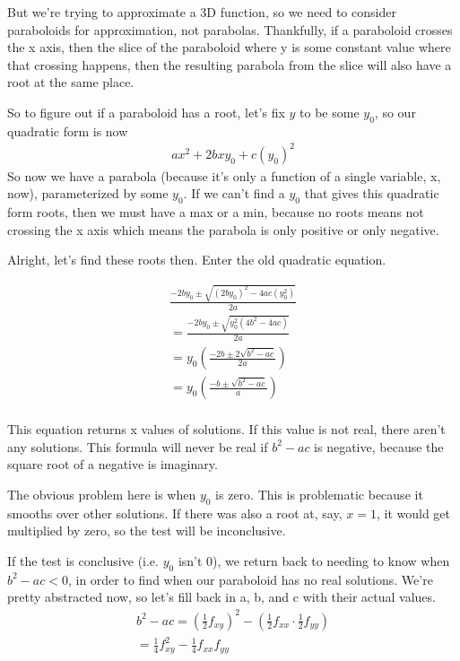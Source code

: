 \documentclass[12pt, letterpaper]{article}
\begin{document}
But we're trying to approximate a 3D function, so we need to consider paraboloids for approximation, not parabolas. Thankfully, if a paraboloid crosses the x axis, then the slice of the paraboloid where y is some constant value where that crossing happens, then the resulting parabola from the slice will also have a root at the same place.

So to figure out if a paraboloid has a root, let's fix $y$ to be some $y_0$, so our quadratic form is now
\begin{gather*}
    ax^2 + 2bxy_0 + c(y_0)^2
\end{gather*}
So now we have a parabola (because it's only a function of a single variable, x, now), parameterized by some $y_0$. If we can't find a $y_0$ that gives this quadratic form roots, then we must have a max or a min, because no roots means not crossing the x axis which means the parabola is only positive or only negative.

Alright, let's find these roots then. Enter the old quadratic equation.

\begin{gather*}
    \frac{-2by_0 \pm \sqrt{(2by_0)^2 - 4ac(y_0^2)}}{2a} \\
    =\frac{-2by_0 \pm \sqrt{y_0^2 (4b^2 - 4ac)}}{2a}\\
    =y_0\left(\frac{-2b \pm 2\sqrt{b^2 - ac}}{2a}\right)\\
    =y_0\left(\frac{-b \pm \sqrt{b^2 - ac}}{a}\right)\\
\end{gather*}

This equation returns x values of solutions. If this value is not real, there aren't any solutions. This formula will never be real if $b^2 - ac$ is negative, because the square root of a negative is imaginary.

The obvious problem here is when $y_0$ is zero. This is problematic because it smooths over other solutions. If there was also a root at, say, $x=1$, it would get multiplied by zero, so the test will be inconclusive.

If the test is conclusive (i.e. $y_0$ isn't 0), we return back to needing to know when $b^2 - ac < 0$, in order to find when our paraboloid has no real solutions. We're pretty abstracted now, so let's fill back in a, b, and c with their actual values.
\begin{gather*}
    b^2 - ac = (\frac{1}{2}f_{xy})^2 - (\frac{1}{2}f_{xx} \cdot \frac{1}{2}f_{yy})\\
    = \frac{1}{4}f_{xy}^2 - \frac{1}{4}f_{xx}f_{yy}\\
\end{gather*}
\end{document}

